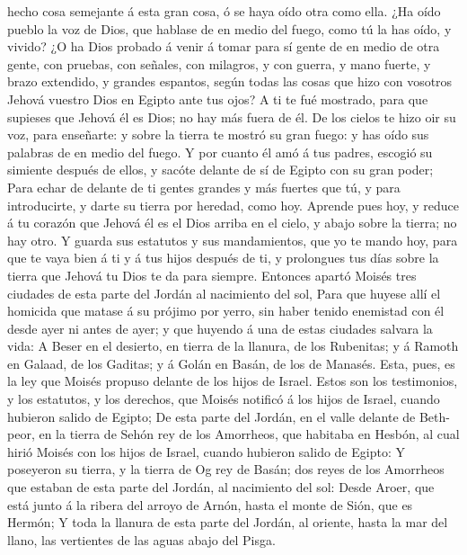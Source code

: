 hecho cosa semejante á esta gran cosa, ó se haya oído otra como ella.
 ¿Ha oído pueblo la voz de Dios, que hablase de en medio
del fuego, como tú la has oído, y vivido?  ¿O ha Dios
probado á venir á tomar para sí gente de en medio de otra gente, con
pruebas, con señales, con milagros, y con guerra, y mano fuerte, y brazo
extendido, y grandes espantos, según todas las cosas que hizo con
vosotros Jehová vuestro Dios en Egipto ante tus ojos?  A
ti te fué mostrado, para que supieses que Jehová él es Dios; no hay más
fuera de él.  De los cielos te hizo oir su voz, para
enseñarte: y sobre la tierra te mostró su gran fuego: y has oído sus
palabras de en medio del fuego.  Y por cuanto él amó á
tus padres, escogió su simiente después de ellos, y sacóte delante de sí
de Egipto con su gran poder;  Para echar de delante de ti
gentes grandes y más fuertes que tú, y para introducirte, y darte su
tierra por heredad, como hoy.  Aprende pues hoy, y reduce
á tu corazón que Jehová él es el Dios arriba en el cielo, y abajo sobre
la tierra; no hay otro.  Y guarda sus estatutos y sus
mandamientos, que yo te mando hoy, para que te vaya bien á ti y á tus
hijos después de ti, y prolongues tus días sobre la tierra que Jehová tu
Dios te da para siempre.  Entonces apartó Moisés tres
ciudades de esta parte del Jordán al nacimiento del sol, 
Para que huyese allí el homicida que matase á su prójimo por yerro, sin
haber tenido enemistad con él desde ayer ni antes de ayer; y que huyendo
á una de estas ciudades salvara la vida:  A Beser en el
desierto, en tierra de la llanura, de los Rubenitas; y á Ramoth en
Galaad, de los Gaditas; y á Golán en Basán, de los de Manasés.
 Esta, pues, es la ley que Moisés propuso delante de los
hijos de Israel.  Estos son los testimonios, y los
estatutos, y los derechos, que Moisés notificó á los hijos de Israel,
cuando hubieron salido de Egipto;  De esta parte del
Jordán, en el valle delante de Beth-peor, en la tierra de Sehón rey de
los Amorrheos, que habitaba en Hesbón, al cual hirió Moisés con los
hijos de Israel, cuando hubieron salido de Egipto:  Y
poseyeron su tierra, y la tierra de Og rey de Basán; dos reyes de los
Amorrheos que estaban de esta parte del Jordán, al nacimiento del sol:
 Desde Aroer, que está junto á la ribera del arroyo de
Arnón, hasta el monte de Sión, que es Hermón;  Y toda la
llanura de esta parte del Jordán, al oriente, hasta la mar del llano,
las vertientes de las aguas abajo del Pisga.

